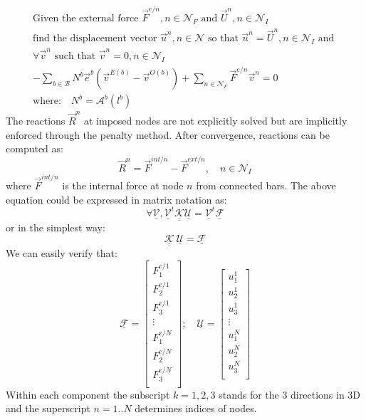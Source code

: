 \documentclass[a4paper,12pt]{article}
\numberwithin{equation}{section}
\theoremstyle{remark}
\begin{document}
  \begin{align}
    \text{Given the external force } \vec{F}^{e/n}, n \in \mathcal{N}_F \text{ and } \vec{U}^{n}, n \in \mathcal{N}_I \nonumber\\
    \text{find the displacement vector } \vec{u}^n, n \in \mathcal{N} \text{ so that } \vec{u}^n = \vec{U}^n, n \in \mathcal{N}_I \text{ and } \nonumber\\
      \forall\vec{v}^n \text{ such that } \vec{v}^n = 0, n \in \mathcal{N}_I \nonumber \\
     - \sum_{b \in \mathcal{B}} N^b \vec{e}^b \left( \vec{v}^{E(b)} - \vec{v}^{O(b)}\right) + \sum_{n \in \mathcal{N}_F} \vec{F}^{e/n} \vec{v}^n  = 0 \\
     \text{where:}\quad N^b = \mathcal{A}^b \left( l^b \right) \nonumber
      \label{nodeEquilibrium3D}
 \end{align}
The reactions $\vec{R}^n$ at imposed nodes are not explicitly solved but are implicitly enforced through the penalty method. After convergence, reactions can be computed as:
\begin{equation}
  \vec{R}^n = \vec{F}^{int/n} - \vec{F}^{ext/n}, \quad n \in \mathcal{N}_I
\end{equation}
where $\vec{F}^{int/n}$ is the internal force at node $n$ from connected bars.
The above equation could be expressed in matrix notation as:
   \begin{equation}
    \forall \underline{\mathcal{V}}, \underline{\mathcal{V}}^t \underline{\underline{\mathcal{K}}} \underline{\mathcal{U}} = \underline{\mathcal{V}}^t \underline{\mathcal{F}}  
   \end{equation} 
    or in the simplest way:  
    \begin{equation}
 \underline{\underline{\mathcal{K}}} \ \underline{\mathcal{U}} = \underline{\mathcal{F}} \label{KU=F}
   \end{equation}
   We can easily verify that:
       \begin{equation} \underline{\mathcal{F}} = 
\begin{bmatrix}  
F_1^{e/1}\\
F_2^{e/1}\\
F_3^{e/1}\\
\vdots\\
F_1^{e/N}\\
F_2^{e/N}\\
F_3^{e/N}\\
\end{bmatrix}   ;\quad \underline{\mathcal{U}} = 
\begin{bmatrix}  
u_1^{1}\\
u_2^{1}\\
u_3^{1}\\
\vdots\\
u_1^{N}\\
u_2^{N}\\
u_3^{N}\\
\end{bmatrix}
\end{equation}
Within each component the subscript $k = 1,2,3$ stands for the 3 directions in 3D and the superscript $n = 1..N$ determines indices of nodes.
\end{document}
